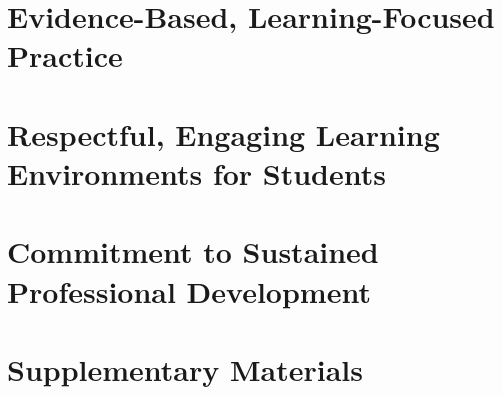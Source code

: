 \documentclass[11pt,titlepage]{article}
\begin{document}
\section{Evidence-Based, Learning-Focused Practice}  %


\section{Respectful, Engaging Learning Environments for Students}  %


\section{Commitment to Sustained Professional Development}  %


\section{Supplementary Materials}  %



\end{document}
